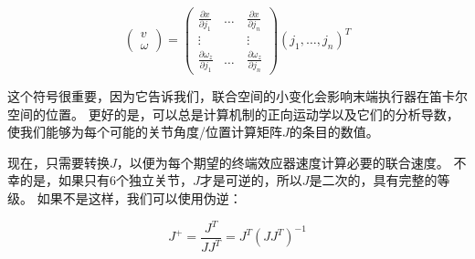 \begin{equation}
\left(\begin{array}{c}v\\\omega\end{array}\right)=\left(\begin{array}{ccc}\frac{\partial{x}}{\partial{j_1}} & \ldots & \frac{\partial{x}}{\partial{j_n}}\\\vdots & \quad & \vdots\\\frac{\partial{\omega_z}}{\partial{j_1}} & \ldots & \frac{\partial{\omega_z}}{\partial{j_n}}\end{array}\right)(j_1,\ldots,j_n)^T
\end{equation}



这个符号很重要，因为它告诉我们，联合空间的小变化会影响末端执行器在笛卡尔空间的位置。 更好的是，可以总是计算机制的正向运动学以及它们的分析导数，使我们能够为每个可能的关节角度/位置计算矩阵$ J $的条目的数值。

现在，只需要转换$ J $，以便为每个期望的终端效应器速度计算必要的联合速度。 不幸的是，如果只有6个独立关节，$ J $才是可逆的，所以$ J $是二次的，具有完整的等级。 如果不是这样，我们可以使用伪逆：

\begin{equation}
J^+=\frac{J^T}{JJ^T}=J^T(JJ^T)^{-1}
\end{equation}


